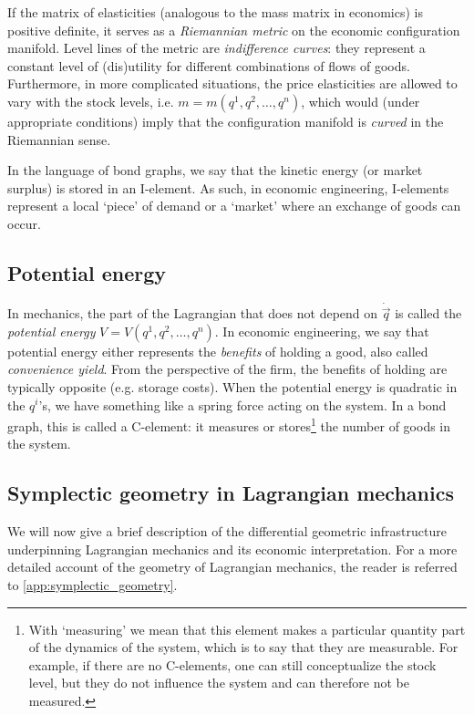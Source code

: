 If the matrix of elasticities (analogous to the mass matrix in economics) is positive definite, it serves as a \emph{Riemannian metric} on the economic configuration manifold. Level lines of the metric are \emph{indifference curves}: they represent a constant level of (dis)utility for different combinations of flows of goods. Furthermore, in more complicated situations, the price elasticities are allowed to vary with the stock levels, i.e. \( m = m(q^1, q^2, \ldots, q^n)\), which would (under appropriate conditions) imply that the configuration manifold is \emph{curved} in the Riemannian sense.

In the language of bond graphs, we say that the kinetic energy (or market surplus) is stored in an I-element. As such, in economic engineering, I-elements represent a local `piece' of demand or a `market' where an exchange of goods can occur.

\subsection{Potential energy} In mechanics, the part of the Lagrangian that does not depend on \(\dot{\vec{q}}\) is called the \emph{potential energy} \(V = V(q^1, q^2, \ldots, q^n)\). In economic engineering, we say that potential energy either represents the \emph{benefits} of holding a good, also called \emph{convenience yield}. From the perspective of the firm, the benefits of holding are typically opposite (e.g. storage costs). When the potential energy is quadratic in the \(q^i\)'s, we have something like a spring force acting on the system. In a bond graph, this is called a C-element: it measures or stores\footnote{With `measuring' we mean that this element makes a particular quantity part of the dynamics of the system, which is to say that they are measurable. For example, if there are no C-elements, one can still conceptualize the stock level, but they do not influence the system and can therefore not be measured.} the number of goods in the system.

\subsection{Symplectic geometry in Lagrangian mechanics} 
We will now give a brief description of the differential geometric infrastructure underpinning Lagrangian mechanics and its economic interpretation. For a more detailed account of the geometry of Lagrangian mechanics, the reader is referred to \cref{app:symplectic_geometry}.


